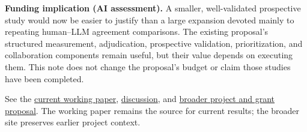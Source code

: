 \documentclass[
  11pt,
  letterpaper,
]{article}
\begin{document}
\textbf{Funding implication (AI assessment).} A smaller, well-validated
prospective study would now be easier to justify than a large expansion
devoted mainly to repeating human--LLM agreement comparisons. The
existing proposal's structured measurement, adjudication, prospective
validation, prioritization, and collaboration components remain useful,
but their value depends on executing them. This note does not change the
proposal's budget or claim those studies have been completed.

See the \hyperref[introduction]{current working paper},
\hyperref[sec-peerless]{discussion}, and
\href{https://llm-uj-research-eval-project.netlify.app/proposal.html}{broader
project and grant proposal}. The working paper remains the source for
current results; the broader site preserves earlier project context.
\end{document}
